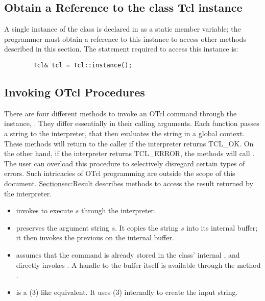 \documentclass{article}
\begin{document}
\subsection{Obtain a Reference to the class Tcl instance}
\label{sec:instance}

A single instance of the class is declared in 
as a static member variable;
the programmer must obtain a reference to this instance
to access other methods described in this section.
The statement required to access this instance is:
\begin{verbatim}
        Tcl& tcl = Tcl::instance();
\end{verbatim}

\subsection{Invoking OTcl Procedures}
\label{sec:Invoke}
There are four different methods to invoke an OTcl command
through the instance, .
They differ essentially in their calling arguments.
Each function passes a string to the interpreter,
that then evaluates the string in a global context.
These methods will return to the caller if the interpreter returns TCL\_OK.
On the other hand, if the interpreter returns TCL\_ERROR,
the methods will call .
The user can overload this procedure to selectively disregard
certain types of errors.
Such intricacies of OTcl programming are outside the
scope of this document.
\href{The next section}{Section}{sec:Result}
describes methods to access the result returned by the interpreter.
\begin{itemize}
\item {}
  invokes  to execute $s$ through the interpreter.

\item {}
  preserves the argument string $s$.
  It copies the string $s$ into its internal buffer;
  it then invokes the previous  on the internal buffer.

\item {}
  assumes that the command is already stored in the class' internal
  , and directly invokes .
  A handle to the buffer itself is available through the method
  .

\item
  is a (3) like equivalent.
  It uses (3) internally to create the input string.
\end{itemize}
\end{document}
